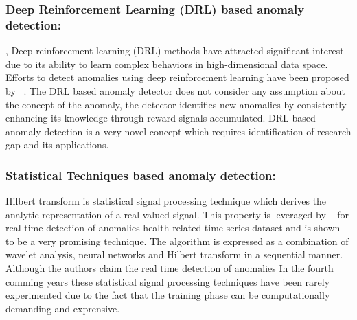 \subsubsection{Deep Reinforcement Learning (DRL) based anomaly detection:}
\label{reinforcementlearning},
Deep reinforcement learning (DRL) methods have attracted significant interest due to its ability to learn complex behaviors in high-dimensional data space. Efforts to detect anomalies using deep reinforcement learning have been proposed by ~\cite{de2017learning,rlanomaly}.
The DRL based anomaly detector  does not consider any assumption about the concept of the anomaly,  the detector identifies new anomalies by consistently enhancing its knowledge  through reward signals accumulated. DRL based anomaly detection is a very novel concept which  requires identification of research gap and its applications.

\subsubsection{Statistical Techniques based anomaly detection: }
Hilbert transform is statistical signal processing technique which derives the analytic representation of a real-valued signal. This property is leveraged by ~\cite{kanarachos2015anomaly} for real time detection of anomalies health related time series dataset and is shown to be a very promising technique. The algorithm is expressed as a combination of wavelet analysis, neural networks and Hilbert transform in a sequential manner.  Although the authors claim the real time detection of anomalies In the fourth comming years these statistical signal processing techniques have been rarely experimented due to the fact that the training phase can be computationally demanding and exprensive.

